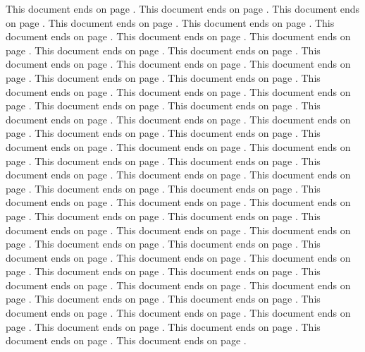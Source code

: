 \documentclass[a4paper]{article}
\begin{document}
This document ends on page \pageref{docend}.
This document ends on page \pageref{docend}.
This document ends on page \pageref{docend}.
This document ends on page \pageref{docend}.
This document ends on page \pageref{docend}.
This document ends on page \pageref{docend}.
This document ends on page \pageref{docend}.
This document ends on page \pageref{docend}.
This document ends on page \pageref{docend}.
This document ends on page \pageref{docend}.
This document ends on page \pageref{docend}.
This document ends on page \pageref{docend}.
This document ends on page \pageref{docend}.
This document ends on page \pageref{docend}.
This document ends on page \pageref{docend}.
This document ends on page \pageref{docend}.
This document ends on page \pageref{docend}.
This document ends on page \pageref{docend}.
This document ends on page \pageref{docend}.
This document ends on page \pageref{docend}.
This document ends on page \pageref{docend}.
This document ends on page \pageref{docend}.
This document ends on page \pageref{docend}.
This document ends on page \pageref{docend}.
This document ends on page \pageref{docend}.
This document ends on page \pageref{docend}.
This document ends on page \pageref{docend}.
This document ends on page \pageref{docend}.
This document ends on page \pageref{docend}.
This document ends on page \pageref{docend}.
This document ends on page \pageref{docend}.
This document ends on page \pageref{docend}.
This document ends on page \pageref{docend}.
This document ends on page \pageref{docend}.
This document ends on page \pageref{docend}.
This document ends on page \pageref{docend}.
This document ends on page \pageref{docend}.
This document ends on page \pageref{docend}.
This document ends on page \pageref{docend}.
This document ends on page \pageref{docend}.
This document ends on page \pageref{docend}.
This document ends on page \pageref{docend}.
This document ends on page \pageref{docend}.
This document ends on page \pageref{docend}.
This document ends on page \pageref{docend}.
This document ends on page \pageref{docend}.
This document ends on page \pageref{docend}.
This document ends on page \pageref{docend}.
This document ends on page \pageref{docend}.
This document ends on page \pageref{docend}.
This document ends on page \pageref{docend}.
This document ends on page \pageref{docend}.
This document ends on page \pageref{docend}.
This document ends on page \pageref{docend}.
This document ends on page \pageref{docend}.
This document ends on page \pageref{docend}.
This document ends on page \pageref{docend}.
This document ends on page \pageref{docend}.
This document ends on page \pageref{docend}.
This document ends on page \pageref{docend}.
This document ends on page \pageref{docend}.
This document ends on page \pageref{docend}.
\end{document}
